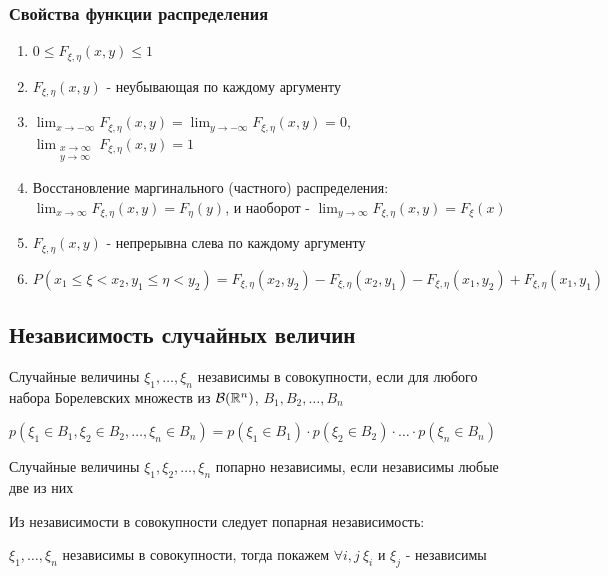\documentclass[12pt]{article}
\begin{document}
    \subsubsection{Свойства функции распределения}

    \begin{enumerate}
        \item $0 \leq F_{\xi, \eta}(x, y) \leq 1$
        \item $F_{\xi, \eta}(x, y)$ - неубывающая по каждому аргументу
        \item $\lim_{x \to -\infty} F_{\xi, \eta}(x, y) = \lim_{y \to -\infty} F_{\xi, \eta}(x, y) = 0, $
        $\lim_{\substack{x \to \infty \\ y \to \infty}} F_{\xi, \eta}(x, y) = 1$

        \item Восстановление маргинального (частного) распределения: 
        $\lim_{x \to \infty} F_{\xi, \eta}(x, y) = F_\eta(y)$, и наоборот - $\lim_{y \to \infty} F_{\xi, \eta}(x, y) = F_\xi(x)$

        \item $F_{\xi, \eta}(x, y)$ - непрерывна слева по каждому аргументу

        \item $P(x_1 \leq \xi < x_2, y_1 \leq \eta < y_2) = F_{\xi, \eta}(x_2, y_2) - F_{\xi, \eta}(x_2, y_1) - F_{\xi, \eta}(x_1, y_2) + F_{\xi, \eta}(x_1, y_1)$
    \end{enumerate}

    \subsection{Независимость случайных величин}

    \Def Случайные величины $\xi_1, \dots, \xi_n$ независимы в совокупности, если для любого набора Борелевских множеств из
    $\mathcal{B}(\mathbb{R}^n)$, $B_1, B_2, \dots, B_n$

    $p(\xi_1 \in B_1, \xi_2 \in B_2, \dots, \xi_n \in B_n) = p(\xi_1 \in B_1) \cdot p(\xi_2 \in B_2) \cdot \dots \cdot p(\xi_n \in B_n)$

    \Def Случайные величины $\xi_1, \xi_2, \dots, \xi_n$ попарно независимы, если независимы любые две из них

    \Notas Из независимости в совокупности следует попарная независимость: 

    $\xi_1, \dots, \xi_n$ независимы в совокупности, тогда покажем $\forall i, j \ \xi_i$ и $\xi_j$ - независимы
\end{document}
